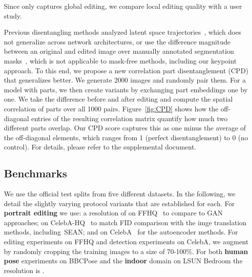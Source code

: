 \documentclass[10pt, conference, compsocconf]{IEEEtran}
\begin{document}
Since  only captures global editing, we compare local editing quality with a user study.

 \label{sec:cpd} Previous disentangling methods analyzed latent space trajectories~\cite{karras2019style}, which does not generalize across network architectures, or use the difference magnitude between an original and edited image over manually annotated segmentation masks~\cite{collins2020editing}, which is not applicable to mask-free methods, including our keypoint approach. To this end, we propose a new correlation part disentanglement (CPD) that generalizes better. We generate 2000 images and randomly pair them. For a model with  parts, we then create  variants by exchanging part embeddings one by one. We take the difference before and after editing and compute the spatial correlation of parts over all 1000 pairs. 
Figure~\ref{fig:CPD} shows how the off-diagonal entries of the resulting correlation matrix quantify how much two different parts overlap.
Our CPD score captures this as one minus the average of the off-diagonal elements, which ranges from 1 (perfect disentanglement) to 0 (no control). For details, please refer to the supplemental document.


\subsection{Benchmarks} We use the official test splits from five different datasets. In the following, we detail the slightly varying protocol variants that are established for each.
For \textbf{portrait editing} we use: a resolution of  on FFHQ~\cite{karras2019style} to compare to GAN approaches;  on CelebA-HQ~\cite{zhu2020sean} to match FID comparison with the imge translation methods, including~SEAN; and  on CelebA~\cite{liu2015faceattributes} for the autoencoder methods. For editing experiments on FFHQ and detection experiments on CelebA, we augment by randomly cropping the training images to a size of 70-100\%.
For both \textbf{human pose} experiments on BBCPose \cite{charles2013domain} and the \textbf{indoor} domain on LSUN Bedroom \cite{yu2015lsun} the resolution is .
\end{document}
